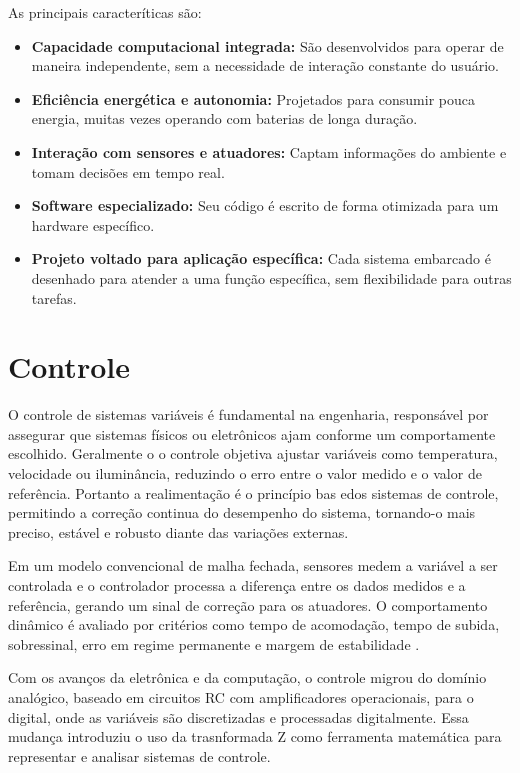 As principais caracteríticas são:
\begin{itemize}
    \item \textbf{Capacidade computacional integrada:} São desenvolvidos para operar de maneira independente, sem a necessidade de interação constante do usuário.
    \item \textbf{Eficiência energética e autonomia:} Projetados para consumir pouca energia, muitas vezes operando com baterias de longa duração.
    \item \textbf{Interação com sensores e atuadores:} Captam informações do ambiente e tomam decisões em tempo real.
    \item \textbf{Software especializado:} Seu código é escrito de forma otimizada para um hardware específico.
    \item \textbf{Projeto voltado para aplicação específica:} Cada sistema embarcado é desenhado para atender a uma função específica, sem flexibilidade para outras tarefas.
\end{itemize}

\section{Controle}

O controle de sistemas variáveis é fundamental na engenharia, responsável por assegurar que sistemas físicos ou eletrônicos ajam conforme um comportamente escolhido. Geralmente o o controle objetiva ajustar variáveis como temperatura, velocidade ou iluminância, reduzindo o erro entre o valor medido e o valor de referência. Portanto a realimentação é o princípio bas edos sistemas de controle, permitindo a correção continua do desempenho do sistema, tornando-o mais preciso, estável e robusto diante das variações externas.

Em um modelo convencional de malha fechada, sensores medem a variável a ser controlada e o controlador processa a diferença entre os dados medidos e a referência, gerando um sinal de correção para os atuadores. O comportamento dinâmico é avaliado por critérios como tempo de acomodação, tempo de subida, sobressinal, erro em regime permanente e margem de estabilidade \cite{Franklin2013}.

Com os avanços da eletrônica e da computação, o controle migrou do domínio analógico, baseado em circuitos RC com amplificadores operacionais, para o digital, onde as variáveis são discretizadas e processadas digitalmente. Essa mudança introduziu o uso da trasnformada Z como ferramenta matemática para representar e analisar sistemas de controle.

